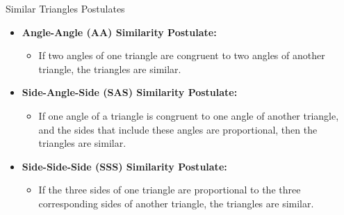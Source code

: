 \documentclass{beamer}
\begin{document}
\begin{frame}{Similar Triangles Postulates}
    \begin{itemize}
        \item \textbf{Angle-Angle (AA) Similarity Postulate:} 
        \begin{itemize}
            \item If two angles of one triangle are congruent to two angles of another triangle, the triangles are similar.
        \end{itemize}

        \item \textbf{Side-Angle-Side (SAS) Similarity Postulate:} 
        \begin{itemize}
            \item If one angle of a triangle is congruent to one angle of another triangle, and the sides that include these angles are proportional, then the triangles are similar.
        \end{itemize}

        \item \textbf{Side-Side-Side (SSS) Similarity Postulate:} 
        \begin{itemize}
            \item If the three sides of one triangle are proportional to the three corresponding sides of another triangle, the triangles are similar.
        \end{itemize}
    \end{itemize}
    
\end{frame}



    


\end{document}

